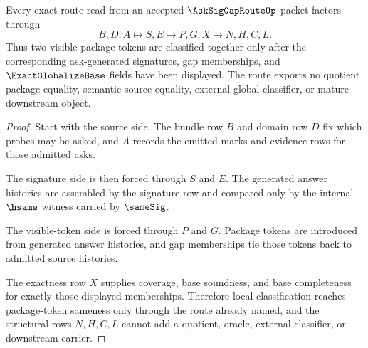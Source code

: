 \begin{theorem}
\label{thm:ask-sig-gap-route-gap-exactness}
Every exact route read from an accepted $\AskSigGapRouteUp$ packet factors through
$$
B,D,A \longmapsto S,E \longmapsto P,G,X \longmapsto N,H,C,L .
$$
Thus two visible package tokens are classified together only after the corresponding ask-generated signatures, gap memberships, and $\ExactGlobalizeBase$ fields have been displayed. The route exports no quotient package equality, semantic source equality, external global classifier, or mature downstream object.
\end{theorem}
\begin{proof}
Start with the source side. The bundle row $B$ and domain row $D$ fix which probes may be asked, and $A$ records the emitted marks and evidence rows for those admitted asks.

The signature side is then forced through $S$ and $E$. The generated answer histories are assembled by the signature row and compared only by the internal $\hsame$ witness carried by $\sameSig$.

The visible-token side is forced through $P$ and $G$. Package tokens are introduced from generated answer histories, and gap memberships tie those tokens back to admitted source histories.

The exactness row $X$ supplies coverage, base soundness, and base completeness for exactly those displayed memberships. Therefore local classification reaches package-token sameness only through the route already named, and the structural rows $N,H,C,L$ cannot add a quotient, oracle, external classifier, or downstream carrier.
\end{proof}




